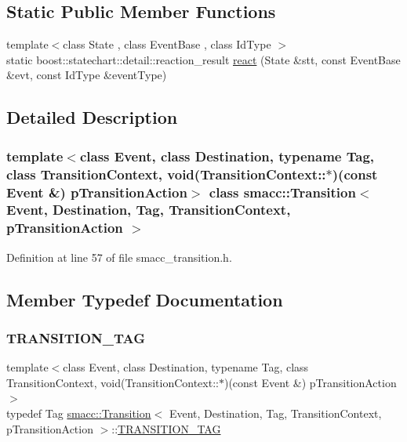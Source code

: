 \subsection*{Static Public Member Functions}
\begin{DoxyCompactItemize}
\item 
{\footnotesize template$<$class State , class Event\+Base , class Id\+Type $>$ }\\static boost\+::statechart\+::detail\+::reaction\+\_\+result \hyperlink{classsmacc_1_1Transition_a8399e8d49fa6f3ac72b06df0b2010932}{react} (State \&stt, const Event\+Base \&evt, const Id\+Type \&event\+Type)
\end{DoxyCompactItemize}


\subsection{Detailed Description}
\subsubsection*{template$<$class Event, class Destination, typename Tag, class Transition\+Context, void(\+Transition\+Context\+::$\ast$)(const Event \&) p\+Transition\+Action$>$\newline
class smacc\+::\+Transition$<$ Event, Destination, Tag, Transition\+Context, p\+Transition\+Action $>$}



Definition at line 57 of file smacc\+\_\+transition.\+h.



\subsection{Member Typedef Documentation}
\mbox{\label{classsmacc_1_1Transition_a672e883135344c4aea140381dd4d1c1d}} 
\subsubsection{\texorpdfstring{T\+R\+A\+N\+S\+I\+T\+I\+O\+N\+\_\+\+T\+AG}{TRANSITION\_TAG}}
{\footnotesize\ttfamily template$<$class Event, class Destination, typename Tag, class Transition\+Context, void(\+Transition\+Context\+::$\ast$)(const Event \&) p\+Transition\+Action$>$ \\
typedef Tag \hyperlink{classsmacc_1_1Transition}{smacc\+::\+Transition}$<$ Event, Destination, Tag, Transition\+Context, p\+Transition\+Action $>$\+::\hyperlink{classsmacc_1_1Transition_a672e883135344c4aea140381dd4d1c1d}{T\+R\+A\+N\+S\+I\+T\+I\+O\+N\+\_\+\+T\+AG}}



